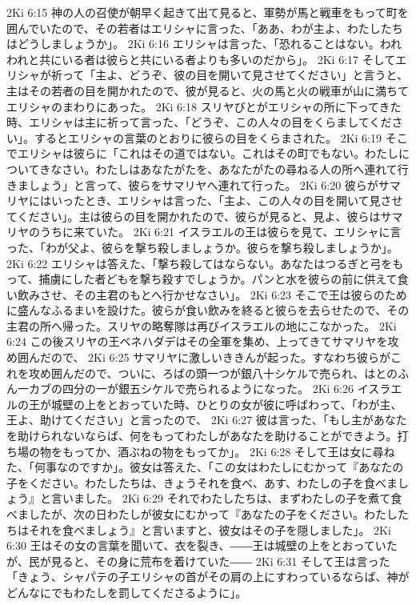 2Ki 6:15  神の人の召使が朝早く起きて出て見ると、軍勢が馬と戦車をもって町を囲んでいたので、その若者はエリシャに言った、「ああ、わが主よ、わたしたちはどうしましょうか」。
2Ki 6:16  エリシャは言った、「恐れることはない。われわれと共にいる者は彼らと共にいる者よりも多いのだから」。
2Ki 6:17  そしてエリシャが祈って「主よ、どうぞ、彼の目を開いて見させてください」と言うと、主はその若者の目を開かれたので、彼が見ると、火の馬と火の戦車が山に満ちてエリシャのまわりにあった。
2Ki 6:18  スリヤびとがエリシャの所に下ってきた時、エリシャは主に祈って言った、「どうぞ、この人々の目をくらましてください」。するとエリシャの言葉のとおりに彼らの目をくらまされた。
2Ki 6:19  そこでエリシャは彼らに「これはその道ではない。これはその町でもない。わたしについてきなさい。わたしはあなたがたを、あなたがたの尋ねる人の所へ連れて行きましょう」と言って、彼らをサマリヤへ連れて行った。
2Ki 6:20  彼らがサマリヤにはいったとき、エリシャは言った、「主よ、この人々の目を開いて見させてください」。主は彼らの目を開かれたので、彼らが見ると、見よ、彼らはサマリヤのうちに来ていた。
2Ki 6:21  イスラエルの王は彼らを見て、エリシャに言った、「わが父よ、彼らを撃ち殺しましょうか。彼らを撃ち殺しましょうか」。
2Ki 6:22  エリシャは答えた、「撃ち殺してはならない。あなたはつるぎと弓をもって、捕虜にした者どもを撃ち殺すでしょうか。パンと水を彼らの前に供えて食い飲みさせ、その主君のもとへ行かせなさい」。
2Ki 6:23  そこで王は彼らのために盛んなふるまいを設けた。彼らが食い飲みを終ると彼らを去らせたので、その主君の所へ帰った。スリヤの略奪隊は再びイスラエルの地にこなかった。
2Ki 6:24  この後スリヤの王ベネハダデはその全軍を集め、上ってきてサマリヤを攻め囲んだので、
2Ki 6:25  サマリヤに激しいききんが起った。すなわち彼らがこれを攻め囲んだので、ついに、ろばの頭一つが銀八十シケルで売られ、はとのふん一カブの四分の一が銀五シケルで売られるようになった。
2Ki 6:26  イスラエルの王が城壁の上をとおっていた時、ひとりの女が彼に呼ばわって、「わが主、王よ、助けてください」と言ったので、
2Ki 6:27  彼は言った、「もし主があなたを助けられないならば、何をもってわたしがあなたを助けることができよう。打ち場の物をもってか、酒ぶねの物をもってか」。
2Ki 6:28  そして王は女に尋ねた、「何事なのですか」。彼女は答えた、「この女はわたしにむかって『あなたの子をください。わたしたちは、きょうそれを食べ、あす、わたしの子を食べましょう』と言いました。
2Ki 6:29  それでわたしたちは、まずわたしの子を煮て食べましたが、次の日わたしが彼女にむかって『あなたの子をください。わたしたちはそれを食べましょう』と言いますと、彼女はその子を隠しました」。
2Ki 6:30  王はその女の言葉を聞いて、衣を裂き、――王は城壁の上をとおっていたが、民が見ると、その身に荒布を着けていた――
2Ki 6:31  そして王は言った「きょう、シャパテの子エリシャの首がその肩の上にすわっているならば、神がどんなにでもわたしを罰してくださるように」。
